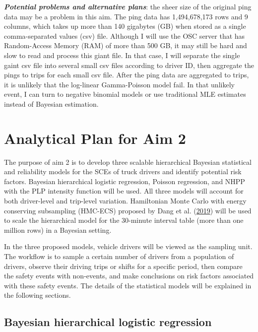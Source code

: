 \documentclass[12pt]{book}
\numberwithin{equation}{chapter}
\begin{document}
\textbf{\emph{Potential problems and alternative plans}}: the sheer size of the original ping data may be a problem in this aim. The ping data has 1,494,678,173 rows and 9 columns, which takes up more than 140 gigabytes (GB) when stored as a single comma-separated values (csv) file. Although I will use the OSC server that has Random-Access Memory (RAM) of more than 500 GB, it may still be hard and slow to read and process this giant file. In that case, I will separate the single gaint csv file into several small csv files according to driver ID, then aggregate the pings to trips for each small csv file. After the ping data are aggregated to trips, it is unlikely that the log-linear Gamma-Poisson model fail. In that unlikely event, I can turn to negative binomial models or use traditional MLE estimates instead of Bayesian estimation.

\hypertarget{analytical-plan-for-aim-2}{%
\section{Analytical Plan for Aim 2}\label{analytical-plan-for-aim-2}}

The purpose of aim 2 is to develop three scalable hierarchical Bayesian statistical and reliability models for the SCEs of truck drivers and identify potential risk factors. Bayesian hierarchical logistic regression, Poisson regression, and NHPP with the PLP intensity function will be used. All three models will account for both driver-level and trip-level variation. Hamiltonian Monte Carlo with energy conserving subsampling (HMC-ECS) proposed by Dang et al. (\protect\hyperlink{ref-dang2019hamiltonian}{2019}) will be used to scale the hierarchical model for the 30-minute interval table (more than one million rows) in a Bayesian setting.

In the three proposed models, vehicle drivers will be viewed as the sampling unit. The workflow is to sample a certain number of drivers from a population of drivers, observe their driving trips or shifts for a specific period, then compare the safety events with non-events, and make conclusions on risk factors associated with these safety events. The details of the statistical models will be explained in the following sections.

\hypertarget{hierarchical-logit}{%
\subsection{Bayesian hierarchical logistic regression}\label{hierarchical-logit}}
\end{document}

